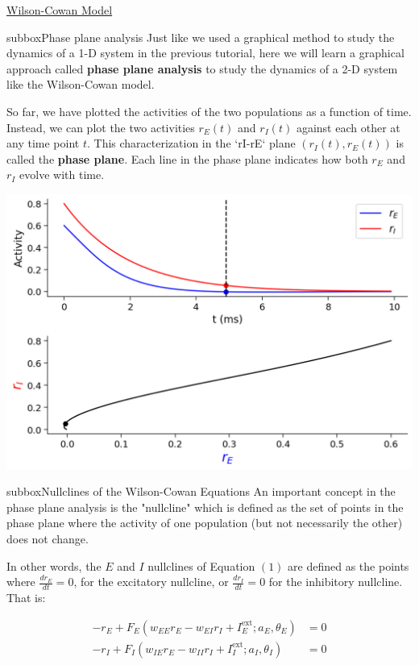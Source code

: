 \begin{textbox}{\href{https://compneuro.neuromatch.io/tutorials/W2D4_DynamicNetworks/chapter_title.html}{Wilson-Cowan Model } }
\begin{subbox}{subbox}{Phase plane analysis}
\scriptsize
Just like we used a graphical method to study the dynamics of a 1-D system in the previous tutorial, here we will learn a  graphical approach called \textbf{phase plane analysis} to study the dynamics of a 2-D system like the Wilson-Cowan model.

So far, we have plotted the activities of the two populations as a function of time. Instead, we can plot the two activities $r_E(t)$ and $r_I(t)$ against each other at any time point $t$. This characterization in the `rI-rE` plane $(r_I(t), r_E(t))$ is called the \textbf{phase plane}. Each line in the phase plane indicates how both $r_E$ and $r_I$ evolve with time.
\begin{center}
\includegraphics[scale=0.3]{Figures/DN/DN_Figure7.png}
\end{center}
\end{subbox}
\begin{subbox}{subbox}{Nullclines of the Wilson-Cowan Equations
}
\scriptsize
An important concept in the phase plane analysis is the "nullcline" which is defined as the set of points in the phase plane where the activity of one population (but not necessarily the other) does not change.

In other words, the $E$ and $I$ nullclines of Equation $(1)$ are defined as the points where $\displaystyle{\frac{dr_E}{dt}}=0$, for the excitatory nullcline, or $\displaystyle\frac{dr_I}{dt}=0$ for the inhibitory nullcline. That is:

\begin{align*}
-r_E + F_E(w_{EE}r_E -w_{EI}r_I + I^{\text{ext}}_E;a_E,\theta_E) &= 0  \\
-r_I + F_I(w_{IE}r_E -w_{II}r_I + I^{\text{ext}}_I;a_I,\theta_I) &= 0  
\end{align*}
\end{subbox}

\end{textbox}
